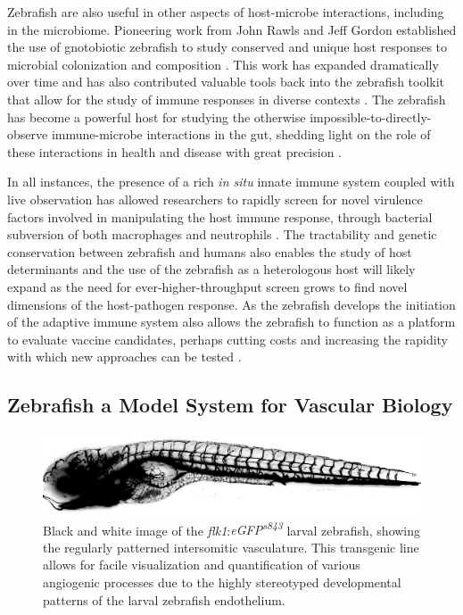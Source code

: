 Zebrafish are also useful in other aspects of host\hyp{}microbe interactions, including in the microbiome. Pioneering work from John Rawls and Jeff Gordon established the use of gnotobiotic zebrafish to study conserved and unique host responses to microbial colonization and composition \citep{Rawls2004, Rawls2006}. This work has expanded dramatically over time and has also contributed valuable tools back into the zebrafish toolkit that allow for the study of immune responses in diverse contexts \citep{Kanther2011}. The zebrafish has become a powerful host for studying the otherwise impossible\hyp{}to\hyp{}directly\hyp{}observe immune\hyp{}microbe interactions in the gut, shedding light on the role of these interactions in health and disease with great precision \citep{Park2019, Murdoch2019a, Murdoch2019b, Espenschied2019}.

In all instances, the presence of a rich \textit{in situ} innate immune system coupled with live observation has allowed researchers to rapidly screen for novel virulence factors involved in manipulating the host immune response, through bacterial subversion of both macrophages and neutrophils \citep{Torraca2018}. The tractability and genetic conservation between zebrafish and humans also enables the study of host determinants and the use of the zebrafish as a heterologous host will likely expand as the need for ever\hyp{}higher\hyp{}throughput screen grows to find novel dimensions of the host\hyp{}pathogen response. As the zebrafish develops the initiation of the adaptive immune system also allows the zebrafish to function as a platform to evaluate vaccine candidates, perhaps cutting costs and increasing the rapidity with which new approaches can be tested \citep{Myllymaki2017}.

\subsection{Zebrafish a Model System for Vascular Biology}\label{zfvasc}

\begin{figure}
\begin{center}
\includegraphics[width=\textwidth]{images/flk1gfp.png}
\caption[\textit{flk1}:\textit{eGFP\textsuperscript{s843}} larval zebrafish at 6 days post fertilization]{Black and white image of the \textit{flk1}:\textit{eGFP\textsuperscript{s843}} larval zebrafish, showing the regularly patterned intersomitic vasculature. This transgenic line allows for facile visualization and quantification of various angiogenic processes due to the highly stereotyped developmental patterns of the larval zebrafish endothelium.}
\label{figure:flk1}
\end{center}
\end{figure}

